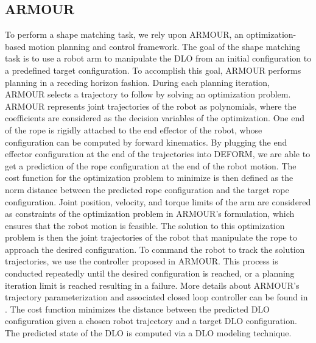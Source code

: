 \subsection{ARMOUR}
\label{appendix ARMOUR}
To perform a shape matching task, we rely upon ARMOUR\cite{ARMOUR}, an optimization-based motion planning and control framework. 
The goal of the shape matching task is to use a robot arm to manipulate the DLO from an initial configuration to a predefined target configuration. 
To accomplish this goal, ARMOUR performs planning in a receding horizon fashion. 
During each planning iteration, ARMOUR selects a trajectory to follow by solving an optimization problem.
ARMOUR represents joint trajectories of the robot as polynomials, where the coefficients are considered as the decision variables of the optimization. 
One end of the rope is rigidly attached to the end effector of the robot, whose configuration can be computed by forward kinematics. 
By plugging the end effector configuration at the end of the trajectories into DEFORM, we are able to get a prediction of the rope configuration at the end of the robot motion. 
The cost function for the optimization problem to minimize is then defined as the norm distance between the predicted rope configuration and the target rope configuration. 
Joint position, velocity, and torque limits of the arm are considered as constraints of the optimization problem in ARMOUR's formulation, which ensures that the robot motion is feasible. 
The solution to this optimization problem is then the joint trajectories of the robot that manipulate the rope to approach the desired configuration. 
To command the robot to track the solution trajectories, we use the controller proposed in ARMOUR. 
This process is conducted repeatedly until the desired configuration is reached, or a planning iteration limit is reached resulting in a failure.
More details about ARMOUR's trajectory parameterization and associated closed loop controller can be found in \cite[Section IX]{ARMOUR}.
The cost function minimizes the distance between the predicted DLO configuration given a chosen robot trajectory and a target DLO configuration.
The predicted state of the DLO is computed via a DLO modeling technique.

